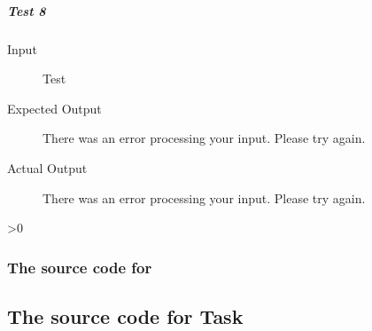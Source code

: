 \documentclass[12pt,a4paper,onesided]{report}
\newcommand{\source}{\pagebreak
	\ifnum\value{section}>0
		\subsection{The source code for \thesection}

	\else
		\section{The source code for Task \thechapter}

	\fi
	}
\begin{document}
	\paragraph{Test 8}
	\begin{description}
		\item[Input] Test
		\item[Expected Output] There was an error processing your input. Please try again.
		\item[Actual Output] There was an error processing your input. Please try again.			
	\end{description}						
\source

\chapter{}
\chapter{}
\printbibliography[title={References}]
\end{document}
